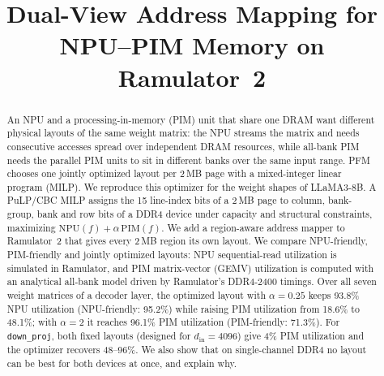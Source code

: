 \documentclass[conference]{IEEEtran}
\begin{document}
\title{Dual-View Address Mapping for NPU--PIM Memory on Ramulator~2}

\author{
\and
{}
\and
{}
\and
{}
}

\maketitle

\begin{abstract}
An NPU and a processing-in-memory (PIM) unit that share one DRAM want different physical layouts of the same weight matrix: the NPU streams the matrix and needs consecutive accesses spread over independent DRAM resources, while all-bank PIM needs the parallel PIM units to sit in different banks over the same input range. PFM~\cite{zhao2026pfm} chooses one jointly optimized layout per 2\,MB page with a mixed-integer linear program (MILP). We reproduce this optimizer for the weight shapes of LLaMA3-8B. A PuLP/CBC MILP assigns the 15 line-index bits of a 2\,MB page to column, bank-group, bank and row bits of a DDR4 device under capacity and structural constraints, maximizing $\mathrm{NPU}(f)+\alpha\,\mathrm{PIM}(f)$. We add a region-aware address mapper to Ramulator~2 that gives every 2\,MB region its own layout. We compare NPU-friendly, PIM-friendly and jointly optimized layouts: NPU sequential-read utilization is simulated in Ramulator, and PIM matrix-vector (GEMV) utilization is computed with an analytical all-bank model driven by Ramulator's DDR4-2400 timings. Over all seven weight matrices of a decoder layer, the optimized layout with $\alpha{=}0.25$ keeps 93.8\% NPU utilization (NPU-friendly: 95.2\%) while raising PIM utilization from 18.6\% to 48.1\%; with $\alpha{=}2$ it reaches 96.1\% PIM utilization (PIM-friendly: 71.3\%). For \texttt{down\_proj}, both fixed layouts (designed for $d_{\mathrm{in}}{=}4096$) give 4\% PIM utilization and the optimizer recovers 48--96\%. We also show that on single-channel DDR4 no layout can be best for both devices at once, and explain why.
\end{abstract}
\end{document}
